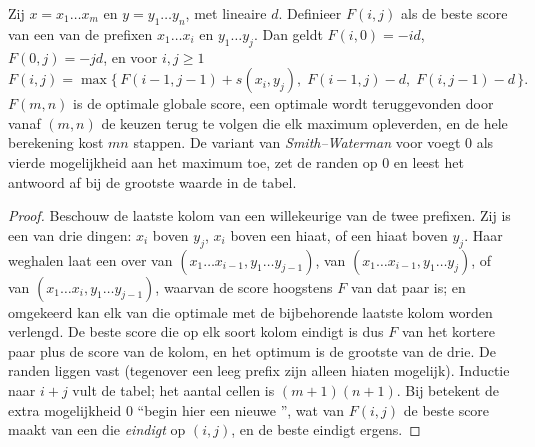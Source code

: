 \begin{theorem}\label{thm:b3:bioinformatics:nw}
Zij $x = x_{1}\dots x_{m}$ en $y = y_{1}\dots y_{n}$, met lineaire
 $d$. Definieer $F(i,j)$ als de beste score van een  van de prefixen $x_{1}\dots x_{i}$ en $y_{1}\dots y_{j}$.
Dan geldt $F(i,0) = -id$, $F(0,j) = -jd$, en voor $i,j \ge 1$
\[
F(i,j) = \max\bigl\{\,F(i-1,j-1) + s(x_{i},y_{j}),\;
F(i-1,j) - d,\; F(i,j-1) - d\,\bigr\}.
\]
$F(m,n)$ is de optimale globale score, een optimale  wordt
teruggevonden door vanaf $(m,n)$ de keuzen terug te volgen die elk
maximum opleverden, en de hele berekening kost $mn$ stappen. De
variant van \emph{Smith--Waterman} voor  voegt $0$ als
vierde mogelijkheid aan het maximum toe, zet de randen op $0$ en leest
het antwoord af bij de grootste waarde in de tabel.
\end{theorem}
\begin{proof}
Beschouw de laatste kolom van een willekeurige  van de twee
prefixen. Zij is een van drie dingen: $x_{i}$ boven $y_{j}$, $x_{i}$
boven een hiaat, of een hiaat boven $y_{j}$. Haar weghalen laat een
 over van $(x_{1}\dots x_{i-1},
y_{1}\dots y_{j-1})$, van $(x_{1}\dots x_{i-1}, y_{1}\dots y_{j})$, of van
$(x_{1}\dots x_{i}, y_{1}\dots y_{j-1})$, waarvan de score hoogstens
$F$ van dat paar is; en omgekeerd kan elk van die optimale 
met de bijbehorende laatste kolom worden verlengd. De beste score die
op elk soort kolom eindigt is dus $F$ van het kortere paar plus de
score van de kolom, en het optimum is de grootste van de drie. De
randen liggen vast (tegenover een leeg prefix zijn alleen hiaten
mogelijk). Inductie naar $i + j$ vult de tabel; het aantal cellen is
$(m+1)(n+1)$. Bij  betekent de extra mogelijkheid $0$
``begin hier een nieuwe '', wat van $F(i,j)$ de beste score
maakt van een  die \emph{eindigt} op $(i,j)$, en de beste
 eindigt ergens.
\end{proof}

